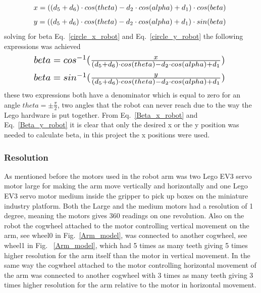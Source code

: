 \begin{equation}
\resizebox{0.8\hsize}{!}{$
    x = ((d_5 + d_6)\cdot cos(theta) - d_2\cdot cos(alpha) + d_1)\cdot cos(beta)
    $
    }
    \label{circle_x_robot}
\end{equation}
\begin{equation}
\resizebox{0.8\hsize}{!}{$
    y = ((d_5 + d_6)\cdot cos(theta) - d_2\cdot cos(alpha) + d_1)\cdot sin(beta)
    $
    }
    \label{circle_y_robot}
\end{equation}
solving for beta Eq.~\eqref{circle_x_robot} and Eq.~\eqref{circle_y_robot} the following expressions was achieved
\begin{equation}
\resizebox{0.8\hsize}{!}{$
    beta = cos^{-1}(\frac{x}{(d_5 + d_6)\cdot cos(theta) - d_2\cdot cos(alpha) + d_1})
    $
    }
    \label{Beta_x_robot}
\end{equation}
\begin{equation}
\resizebox{0.8\hsize}{!}{$
    beta = sin^{-1}(\frac{y}{(d_5 + d_6)\cdot cos(theta) - d_2\cdot cos(alpha) + d_1})
    $
    }
    \label{Beta_y_robot}
\end{equation}
these two expressions both have a denominator which is equal to zero for an angle \(theta = \pm \frac{\pi}{2}\), two angles that the robot can never reach due to the way the Lego hardware is put together.
From Eq.~\eqref{Beta_x_robot} and Eq.~\eqref{Beta_y_robot} it is clear that only the desired x or the y position was needed to calculate beta, in this project the x positions were used.
\subsubsection{Resolution}
\label{sec:simon5}
As mentioned before the motors used in the robot arm was two Lego EV3 servo motor large for making the arm move vertically and horizontally and one Lego EV3 servo motor medium inside the gripper to pick up boxes on the miniature industry platform. Both the Large and the medium motors had a resolution of 1 degree, meaning the motors gives 360 readings on one revolution. Also on the robot the cogwheel attached to the motor controlling vertical movement on the arm, see wheel0 in Fig.~\ref{Arm_model}, was connected to another cogwheel, see wheel1 in Fig.
~\ref{Arm_model}, which had 5 times as many teeth giving 5 times higher resolution for the arm itself than the motor in vertical movement. In the same way the cogwheel attached to the motor controlling horizontal movement of the arm was connected to another cogwheel with 3 times as many teeth giving 3 times higher resolution for the arm relative to the motor in horizontal movement.
